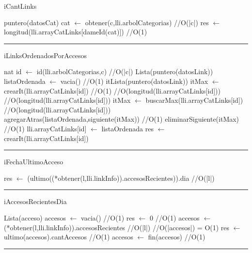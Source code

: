 \begin{algorithm}[H]
\caption{iCantLinks}
\begin{algorithmic}[1]
\state puntero(datosCat) cat $\gets$ obtener(c,lli.arbolCategorias) \hfill //O(|c|)
\state res $\gets$ longitud(lli.arrayCatLinks[dameId(cat)]) \hfill //O(1)
\EndFunction 
\end{algorithmic}
\hrule
{}
\end{algorithm}

\begin{algorithm}[H]
\caption{iLinksOrdenadosPorAccesos}
\begin{algorithmic}[1]
\state nat id $\gets$ id(lli.arbolCategorias,c) \hfill//O(|c|)
\state Lista(puntero(datosLink)) listaOrdenada $\gets$ vacia() \hfill//O(1)
\state itLista(puntero(datosLink)) itMax $\gets$ crearIt(lli.arrayCatLinks[id]) \hfill //O(1)
 \hfill //O(longitud(lli.arrayCatLinks[id]))
 \hfill //O(longitud(lli.arrayCatLinks[id]))
\state itMax $\gets$ buscarMax(lli.arrayCatLinks[id]) \hfill //O(longitud(lli.arrayCatLinks[id]))
\state agregarAtras(listaOrdenada,siguiente(itMax)) \hfill //O(1)
\state eliminarSiguiente(itMax) \hfill //O(1)
\endwhile
\state lli.arrayCatLinks[id] $\gets$ listaOrdenada
\Else
\state res $\gets$ crearIt(lli.arrayCatLinks[id])
\endif
\EndFunction 
\end{algorithmic}
\hrule
{}
\end{algorithm}

\begin{algorithm}[H]
\caption{iFechaUltimoAcceso}
\begin{algorithmic}[1]
\state res $\gets$ (ultimo((*obtener(l,lli.linkInfo)).accesosRecientes)).dia \hfill //O(|l|)
\EndFunction 
\end{algorithmic}
\hrule
{}
\end{algorithm}

\begin{algorithm}[H]
\caption{iAccesosRecientesDia}
\begin{algorithmic}[1]
\state Lista(acceso) accesos $\gets$ vacia() \hfill //O(1)
\state res $\gets$ 0 \hfill //O(1)
\state accesos $\gets$ (*obtener(l,lli.linkInfo)).accesosRecientes \hfill //O(|l|)
\hfill //O(|accesos|) = O(1)
\state res $\gets$ ultimo(accesos).cantAccesos \hfill //O(1)
\Else
\state accesos $\gets$ fin(accesos) \hfill //O(1)
\endif
\endwhile
\EndFunction 
\end{algorithmic}
\hrule
{}
\end{algorithm}

